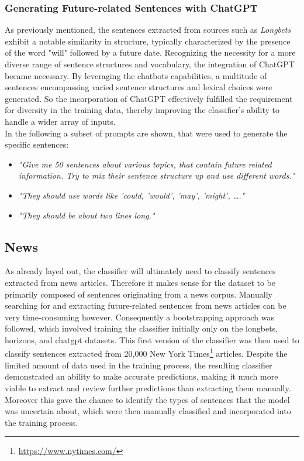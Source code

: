 \documentclass[a4paper,10pt]{report} %
\begin{document}
\subsubsection{Generating Future-related Sentences with ChatGPT}
As previously mentioned, the sentences extracted from sources such as \textit{Longbets} exhibit a notable similarity in structure, typically characterized by the presence of the word "will" followed by a future date. Recognizing the necessity for a more diverse range of sentence structures and vocabulary, the integration of ChatGPT became necessary. By leveraging the chatbots capabilities, a multitude of sentences encompassing varied sentence structures and lexical choices were generated. So the incorporation of ChatGPT effectively fulfilled the requirement for diversity in the training data, thereby improving the classifier's ability to handle a wider array of inputs. \\

In the following a subset of prompts are shown, that were used to generate the specific sentences:
\begin{itemize}
  \item \textit{"Give me 50 sentences about various topics, that contain future related information. Try to mix their sentence structure up and use different words."}
  \item \textit{"They should use words like 'could, 'would', 'may', 'might', …."}
  \item \textit{"They should be about two lines long."}
\end{itemize}

\subsection{News}
As already layed out, the classifier will ultimately need to classify sentences extracted from news articles. Therefore it makes sense for the dataset to be primarily composed of sentences originating from a news corpus. Manually searching for and extracting future-related sentences from news articles can be very time-consuming however. Consequently a bootstrapping approach was followed, which involved training the classifier initially only on the longbets, horizons, and chatgpt datasets. This first version of the classifier was then used to classify sentences extracted from 20,000 New York Times\footnote{\url{https://www.nytimes.com/}} articles.
Despite the limited amount of data used in the training process, the resulting classifier demonstrated an ability to make accurate predictions, making it much more viable to extract and review further predictions than extracting them manually. Moreover this gave the chance to identify the types of sentences that the model was uncertain about, which were then manually classified and incorporated into the training process.
\end{document}
